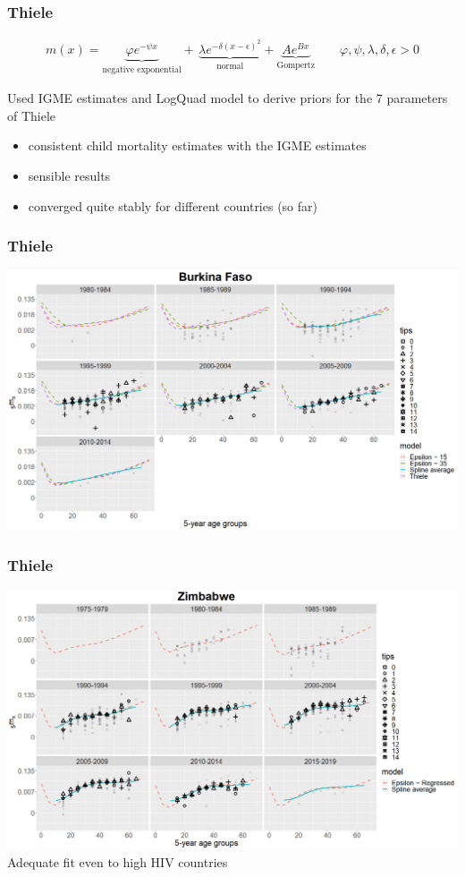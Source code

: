 \documentclass[hyperref={colorlinks, citecolor=blue}]{beamer}
\begin{document}
\begin{frame}
\frametitle{Thiele}

 \begin{align*}
m(x) = \underbrace{\varphi e^{-\psi x}}_\text{negative exponential} + \, \underbrace{\lambda e^{-\delta (x-\epsilon)^2}}_\text{normal}+ \underbrace{A e^{B x}}_\text{Gompertz} \qquad \varphi,\psi,\lambda,\delta,\epsilon > 0
 \end{align*}

Used IGME estimates and LogQuad model to derive priors for the 7 parameters of Thiele
\begin{itemize}
\item consistent child mortality estimates with the IGME estimates
\item sensible results
\item converged quite stably for different countries (so far)
\end{itemize}
\end{frame}


\begin{frame}
\frametitle{Thiele}
\includegraphics[width=\linewidth]{Graphs/Thiele female.png}
\end{frame}

\begin{frame}
\frametitle{Thiele}
\includegraphics[width=\linewidth]{Graphs/Zimbabwe female.png}
Adequate fit even to high HIV countries
\end{frame}
\end{document}
